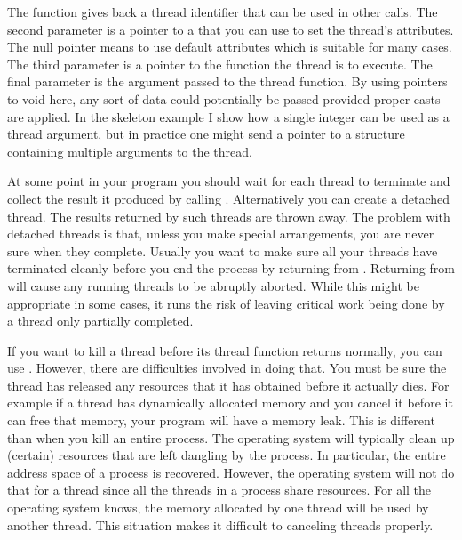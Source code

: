 The  function gives back a thread identifier that can be used in
other calls. The second parameter is a pointer to a  that you
can use to set the thread's attributes. The null pointer means to use default attributes which
is suitable for many cases. The third parameter is a pointer to the function the thread is to
execute. The final parameter is the argument passed to the thread function. By using pointers to
void here, any sort of data could potentially be passed provided proper casts are applied. In
the skeleton example I show how a single integer can be used as a thread argument, but in
practice one might send a pointer to a structure containing multiple arguments to the thread.

At some point in your program you should wait for each thread to terminate and collect the
result it produced by calling . Alternatively you can create a detached
thread. The results returned by such threads are thrown away. The problem with detached threads
is that, unless you make special arrangements, you are never sure when they complete. Usually
you want to make sure all your threads have terminated cleanly before you end the process by
returning from . Returning from  will cause any running threads
to be abruptly aborted. While this might be appropriate in some cases, it runs the risk of
leaving critical work being done by a thread only partially completed.

If you want to kill a thread before its thread function returns normally, you can use
. However, there are difficulties involved in doing that. You must be
sure the thread has released any resources that it has obtained before it actually dies. For
example if a thread has dynamically allocated memory and you cancel it before it can free that
memory, your program will have a memory leak. This is different than when you kill an entire
process. The operating system will typically clean up (certain) resources that are left dangling
by the process. In particular, the entire address space of a process is recovered. However, the
operating system will not do that for a thread since all the threads in a process share
resources. For all the operating system knows, the memory allocated by one thread will be used
by another thread. This situation makes it difficult to canceling threads properly.

%
%

